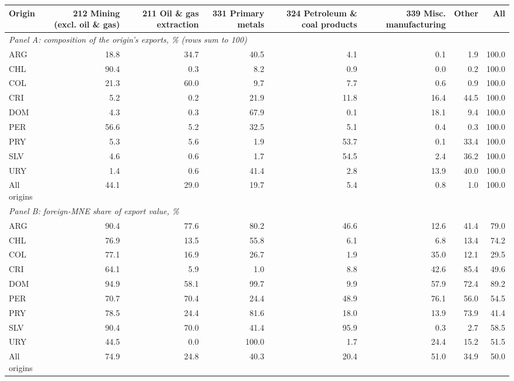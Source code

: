 \begin{tabular}{lrrrrrrr}
\toprule
Origin & 212 Mining (excl. oil \& gas) & 211 Oil \& gas extraction & 331 Primary metals & 324 Petroleum \& coal products & 339 Misc. manufacturing & Other & All \\
\midrule
\multicolumn{8}{l}{\textit{Panel A: composition of the origin's exports, \% (rows sum to 100)}} \\
ARG & 18.8 & 34.7 & 40.5 & 4.1 & 0.1 & 1.9 & 100.0 \\
CHL & 90.4 & 0.3 & 8.2 & 0.9 & 0.0 & 0.2 & 100.0 \\
COL & 21.3 & 60.0 & 9.7 & 7.7 & 0.6 & 0.9 & 100.0 \\
CRI & 5.2 & 0.2 & 21.9 & 11.8 & 16.4 & 44.5 & 100.0 \\
DOM & 4.3 & 0.3 & 67.9 & 0.1 & 18.1 & 9.4 & 100.0 \\
PER & 56.6 & 5.2 & 32.5 & 5.1 & 0.4 & 0.3 & 100.0 \\
PRY & 5.3 & 5.6 & 1.9 & 53.7 & 0.1 & 33.4 & 100.0 \\
SLV & 4.6 & 0.6 & 1.7 & 54.5 & 2.4 & 36.2 & 100.0 \\
URY & 1.4 & 0.6 & 41.4 & 2.8 & 13.9 & 40.0 & 100.0 \\
All origins & 44.1 & 29.0 & 19.7 & 5.4 & 0.8 & 1.0 & 100.0 \\
\midrule
\multicolumn{8}{l}{\textit{Panel B: foreign-MNE share of export value, \%}} \\
ARG & 90.4 & 77.6 & 80.2 & 46.6 & 12.6 & 41.4 & 79.0 \\
CHL & 76.9 & 13.5 & 55.8 & 6.1 & 6.8 & 13.4 & 74.2 \\
COL & 77.1 & 16.9 & 26.7 & 1.9 & 35.0 & 12.1 & 29.5 \\
CRI & 64.1 & 5.9 & 1.0 & 8.8 & 42.6 & 85.4 & 49.6 \\
DOM & 94.9 & 58.1 & 99.7 & 9.9 & 57.9 & 72.4 & 89.2 \\
PER & 70.7 & 70.4 & 24.4 & 48.9 & 76.1 & 56.0 & 54.5 \\
PRY & 78.5 & 24.4 & 81.6 & 18.0 & 13.9 & 73.9 & 41.4 \\
SLV & 90.4 & 70.0 & 41.4 & 95.9 & 0.3 & 2.7 & 58.5 \\
URY & 44.5 & 0.0 & 100.0 & 1.7 & 24.4 & 15.2 & 51.5 \\
All origins & 74.9 & 24.8 & 40.3 & 20.4 & 51.0 & 34.9 & 50.0 \\
\bottomrule
\end{tabular}
